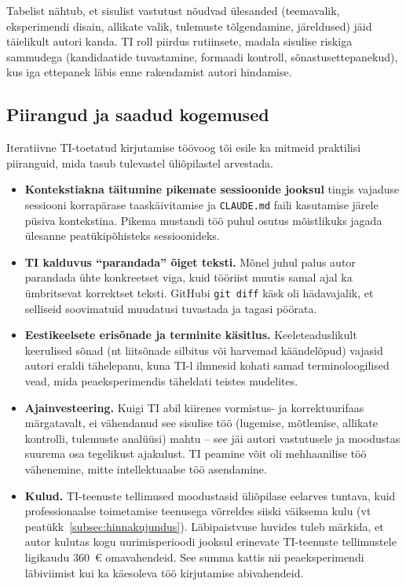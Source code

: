 Tabelist nähtub, et sisulist vastutust nõudvad ülesanded (teemavalik, eksperimendi disain, allikate valik, tulemuste tõlgendamine, järeldused) jäid täielikult autori kanda. TI roll piirdus rutiinsete, madala sisulise riskiga sammudega (kandidaatide tuvastamine, formaadi kontroll, sõnastusettepanekud), kus iga ettepanek läbis enne rakendamist autori hindamise.

\subsection{Piirangud ja saadud kogemused} \label{subsec:toovoog-piirangud}

Iteratiivne TI-toetatud kirjutamise töövoog tõi esile ka mitmeid praktilisi piiranguid, mida tasub tulevastel üliõpilastel arvestada.

\begin{itemize}
    \item \textbf{Kontekstiakna täitumine pikemate sessioonide jooksul} tingis vajaduse sessiooni korrapärase taaskäivitamise ja \texttt{CLAUDE.md} faili kasutamise järele püsiva kontekstina. Pikema mustandi töö puhul osutus mõistlikuks jagada ülesanne peatükipõhisteks sessioonideks.
    \item \textbf{TI kalduvus ``parandada'' õiget teksti.} Mõnel juhul palus autor parandada ühte konkreetset viga, kuid tööriist muutis samal ajal ka ümbritsevat korrektset teksti. GitHubi \texttt{git diff} käsk oli hädavajalik, et selliseid soovimatuid muudatusi tuvastada ja tagasi pöörata.
    \item \textbf{Eestikeelsete erisõnade ja terminite käsitlus.} Keeleteaduslikult keerulised sõnad (nt liitsõnade silbitus või harvemad käändelõpud) vajasid autori eraldi tähelepanu, kuna TI-l ilmnesid kohati samad terminoloogilised vead, mida peaeksperimendis täheldati teistes mudelites.
    \item \textbf{Ajainvesteering.} Kuigi TI abil kiirenes vormistus- ja korrektuurifaas märgatavalt, ei vähendanud see sisulise töö (lugemise, mõtlemise, allikate kontrolli, tulemuste analüüsi) mahtu -- see jäi autori vastutusele ja moodustas suurema osa tegelikust ajakulust. TI peamine võit oli mehhaanilise töö vähenemine, mitte intellektuaalse töö asendamine.
    \item \textbf{Kulud.} TI-teenuste tellimused moodustasid üliõpilase eelarves tuntava, kuid professionaalse toimetamise teenusega võrreldes siiski väiksema kulu (vt peatükk~\ref{subsec:hinnakujundus}). Läbipaistvuse huvides tuleb märkida, et autor kulutas kogu uurimisperioodi jooksul erinevate TI-teenuste tellimustele ligikaudu 360~€ omavahendeid. See summa kattis nii peaeksperimendi läbiviimist kui ka käesoleva töö kirjutamise abivahendeid.
\end{itemize}

